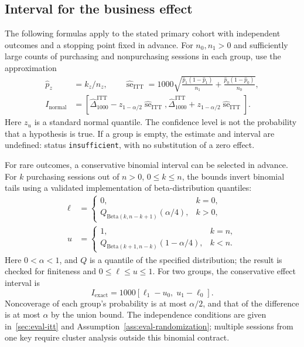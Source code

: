 \documentclass[12pt,a4paper]{article}
\theoremstyle{plainru}
\begin{document}
\subsection{Interval for the business effect}\label{sec:eval-itt-ci}

The following formulas apply to the stated primary cohort with independent
outcomes and a stopping point fixed in advance. For $n_0,n_1>0$ and
sufficiently large counts of purchasing and nonpurchasing sessions
in each group, use the approximation
\begin{align}
 \widehat p_z&=k_z/n_z,\qquad
 \widehat{\operatorname{se}}_{\mathrm{ITT}}
 =1000\sqrt{\frac{\widehat p_1(1-\widehat p_1)}{n_1}
              +\frac{\widehat p_0(1-\widehat p_0)}{n_0}},
 \label{eq:eval-itt-se}\\
 I_{\mathrm{normal}}
 &=\left[\widehat\Delta_{1000}^{\mathrm{ITT}}
       -z_{1-\alpha/2}\widehat{\operatorname{se}}_{\mathrm{ITT}},
         \widehat\Delta_{1000}^{\mathrm{ITT}}
       +z_{1-\alpha/2}\widehat{\operatorname{se}}_{\mathrm{ITT}}\right].
 \label{eq:eval-itt-normal-ci}
\end{align}
Here $z_u$ is a standard normal quantile.
The confidence level is not the probability that a hypothesis is true.
If a group is empty, the estimate and interval are undefined: status
\texttt{insufficient}, with no substitution of a zero effect.

For rare outcomes, a conservative binomial
interval can be selected in advance. For $k$ purchasing sessions out of $n>0$, $0\le k\le n$,
the bounds invert binomial tails using a validated implementation
of beta-distribution quantiles:
\begin{subequations}\label{eq:eval-exact-beta}
\begin{align}
\ell&=\begin{cases}
0,&k=0,\\
Q_{\mathrm{Beta}(k,n-k+1)}(\alpha/4),&k>0,
\end{cases}\label{eq:eval-exact-lower}\\
u&=\begin{cases}
1,&k=n,\\
Q_{\mathrm{Beta}(k+1,n-k)}(1-\alpha/4),&k<n.
\end{cases}\label{eq:eval-exact-upper}
\end{align}
\end{subequations}
Here $0<\alpha<1$, and $Q$ is a quantile of the specified distribution;
the result is checked for finiteness and $0\le\ell\le u\le1$.
For two groups, the conservative effect interval is
\begin{equation}\label{eq:eval-exact-diff}
 I_{\mathrm{exact}}=1000[\ell_1-u_0,\;u_1-\ell_0].
\end{equation}
Noncoverage of each group's probability is at most $\alpha/2$,
and that of the difference is at most $\alpha$ by the union bound.
The independence conditions are given in~\ref{sec:eval-itt}
and Assumption~\ref{ass:eval-randomization}; multiple sessions from one key
require cluster analysis outside this binomial contract.
\end{document}
